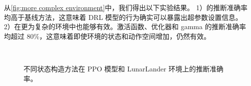 从\autoref{fig:more complex environment}中，我们得出以下实验结果。
1）\sysname 的推断准确率均高于基线方法，这意味着 DRL 模型的行为确实可以暴露出超参数设置信息。
2）\sysname 在更为复杂的环境中也能够有效。激活函数、优化器和 gamma 的推断准确率均超过 80\%，这意味着即使环境的状态和动作空间增加，\sysname 仍然有效。

\begin{figure}[!ht]
    \centering
    \\[-3ex]
    \caption{不同状态构造方法在 PPO 模型和 LunarLander 环境上的推断准确率。
        } 
    \label{fig:more complex environment}
\end{figure}


